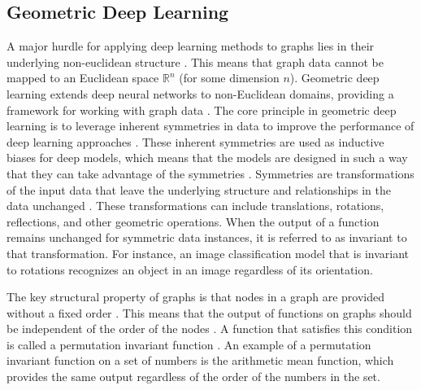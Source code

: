 \subsection{Geometric Deep Learning}
\label{s_Background_GeometricDeepLearning}


A major hurdle for applying deep learning methods to graphs lies in their underlying non-euclidean structure \cite{wu_comprehensive_2021}. This means that graph data cannot be mapped to an Euclidean space $\mathbb{R}^n$ (for some dimension $n$). Geometric deep learning extends deep neural networks to non-Euclidean domains, providing a framework for working with graph data \cite{bronstein_geometric_2017, bronstein_geometric_2021}. The core principle in geometric deep learning is to leverage inherent symmetries in data to improve the performance of deep learning approaches \cite{bronstein_geometric_2021}. These inherent symmetries are used as inductive biases for deep models, which means that the models are designed in such a way that they can take advantage of the symmetries \cite{bronstein_geometric_2021}. Symmetries are transformations of the input data that leave the underlying structure and relationships in the data unchanged \cite{bronstein_geometric_2021}. These transformations can include translations, rotations, reflections, and other geometric operations. When the output of a function remains unchanged for symmetric data instances, it is referred to as invariant to that transformation. For instance, an image classification model that is invariant to rotations recognizes an object in an image regardless of its orientation. 



The key structural property of graphs is that nodes in a graph are provided without a fixed order \cite{bronstein_geometric_2021}. This means that the output of functions on graphs should be independent of the order of the nodes \cite{bronstein_geometric_2021}. A function that satisfies this condition is called a permutation invariant function \cite{bronstein_geometric_2021}. An example of a permutation invariant function on a set of numbers is the arithmetic mean function, which provides the same output regardless of the order of the numbers in the set.

